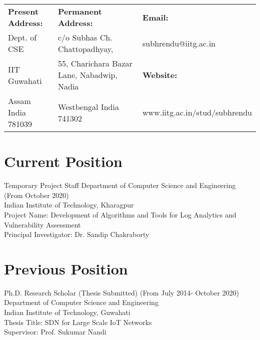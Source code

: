 \documentclass{article}
\begin{document}
 
\begin{center}
	\Large{\bf \name}
\end{center}
%                                  
	\begin{table}[h]
	\centering
	\begin{tabular}{|lll|}
	\hline
	{\bf Present Address:}    & {\bf Permanent Address:}        					&	{\bf Email:}               \\
	Dept. of CSE       				& c/o Subhas Ch. Chattopadhyay, 					&	subhrendu@iitg.ac.in         \\
	IIT Guwahati       			& 55, Charichara Bazar Lane, Nabadwip, Nadia  &	{\bf Website:}  \\
	Assam India 781039 		& Westbengal  India 741302 							&	www.iitg.ac.in/stud/subhrendu \\ \hline
	\end{tabular}
	\end{table}
 \noindent\makebox[\linewidth]{\rule{\textwidth}{0.4pt}}
\section{Current Position}          
Temporary 	Project Staff
Department of Computer Science and Engineering (From October 2020)\\
Indian Institute of Technology, Kharagpur\\
Project Name: Development of Algorithms and Tools for Log Analytics  and Vulnerability Assessment \\
Principal Investigator: Dr. Sandip Chakraborty
\section{Previous Position}
	Ph.D. Research Scholar (Thesis Submitted)  (From July 2014- October 2020)\\
    Department of Computer Science and Engineering\\
    Indian Institute of Technology, Guwahati\\
    Thesis Title: SDN for Large Scale IoT Networks\\
    Supervisor: Prof. Sukumar Nandi
\end{document}
